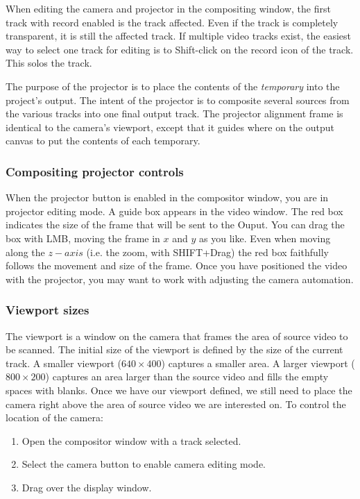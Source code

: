 When editing the camera and projector in the compositing window, the first track with record enabled is the track affected. 
Even if the track is completely transparent, it is still the affected track. 
If multiple video tracks exist, the easiest way to select one track for editing is to Shift-click on the record icon of the track. 
This solos the track.

The purpose of the projector is to place the contents of the \textit{temporary} into the project's output.  
The intent of the projector is to composite several sources from the various tracks into one final output track. 
The projector alignment frame is identical to the camera's viewport, except that it guides where on the output canvas to put the contents of each temporary.

\subsubsection*{Compositing projector controls}%
\label{ssub:compositing_projector_controls}

When the projector button is enabled in the compositor window, you are in projector editing mode. A guide box appears in the video window. The red box indicates the size of the frame that will be sent to the Ouput. You can drag the box with LMB, moving the frame in $x$ and $y$ as you like. Even when moving along the $z-axis$ (i.e. the zoom, with SHIFT+Drag) the red box faithfully follows the movement and size of the frame. Once you have positioned the video with the projector, you may want to work with adjusting the camera automation.

\subsubsection*{Viewport sizes}%
\label{ssub:viewport_sizes}

The viewport is a window on the camera that frames the area of source video to be scanned.
The initial size of the viewport is defined by the size of the current track. A smaller viewport ($640\times400$) captures a smaller area. 
A larger viewport ($800\times200$) captures an area larger than the source video and fills the empty spaces with blanks. 
Once we have our viewport defined, we still need to place the camera right above the area of source video we are interested on. To control the location of the camera:

\begin{enumerate}
    \item  Open the compositor window with a track selected.
    \item  Select the camera button to enable camera editing mode.
    \item  Drag over the display window.
\end{enumerate}

